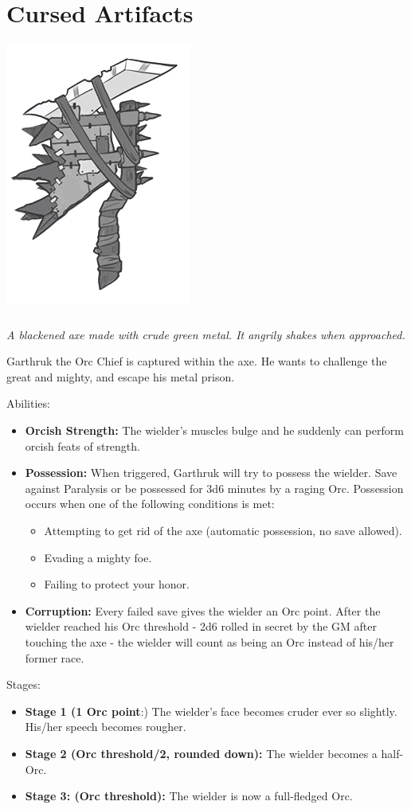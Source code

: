 \documentclass[letterpaper,sansserif,tightsqueeze]{rpg-module}
\begin{document}
\newpage

\vspace{0.5cm}
\part*{Cursed Artifacts}
\vspace{0.5cm}

\begin{center}
	\includegraphics[width = 0.3\linewidth]{Garthruks_axe.png}
\end{center}
\section*{}
\textit{A blackened axe made with crude green metal. It angrily shakes when approached.}

Garthruk the Orc Chief is captured within the axe. He wants to challenge the great and mighty, and escape his metal prison.

Abilities:
\begin{itemize}
	\item \textbf{Orcish Strength:} The wielder's muscles bulge and he suddenly can perform orcish feats of strength.
	\item \textbf{Possession:} When triggered, Garthruk will try to possess the wielder. Save against Paralysis or be possessed for 3d6 minutes by a raging Orc. Possession occurs when one of the following conditions is met:
	\begin{itemize}
		\item Attempting to get rid of the axe (automatic possession, no save allowed).
		\item Evading a mighty foe.
		\item Failing to protect your honor.
	\end{itemize}
	\item \textbf{Corruption:} Every failed save gives the wielder an Orc point. After the wielder reached his Orc threshold - 2d6 rolled in secret by the GM after touching the axe - the wielder will count as being an Orc instead of his/her former race.
\end{itemize}
Stages: 
\begin{itemize}
	\item \textbf{Stage 1 (1 Orc point}:) The wielder's face becomes cruder ever so slightly. His/her speech becomes rougher. 
	\item \textbf{Stage 2 (Orc threshold/2, rounded down):} The wielder becomes a half-Orc.
	\item \textbf{Stage 3: (Orc threshold):} The wielder is now a full-fledged Orc.
\end{itemize}
\end{document}

